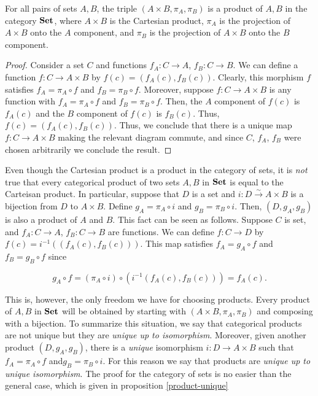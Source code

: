 \begin{prop}\label{product-in-set} For all pairs of sets $A,B$, the triple $(A\times B,\pi_A,\pi_B)$ is a product of $A,B$ in the category ${\bf Set}$, where $A\times B$ is the Cartesian product, $\pi_A$ is the projection of $A\times B$ onto the $A$ component, and $\pi_B$ is the projection of $A\times B$ onto the $B$ component.
\end{prop}
\begin{proof} Consider a set $C$ and functions $f_A:C\to A$, $f_B:C\to B$. We can define a function $f:C\to A\times B$ by $f(c)=(f_A(c),f_B(c))$. Clearly, this morphism $f$ satisfies $f_A=\pi_A\circ f$ and $f_B=\pi_B\circ f$. Moreover, suppose $f:C\to A\times B$ is any function with $f_A=\pi_A\circ f$ and $f_B=\pi_B\circ f$. Then, the $A$ component of $f(c)$ is $f_A(c)$ and the $B$ component of $f(c)$ is $f_B(c)$. Thus, $f(c)=(f_A(c),f_B(c))$. Thus, we conclude that there is a unique map $f:C\to A\times B$ making the relevant diagram commute, and since $C$, $f_A$, $f_B$ were chosen arbitrarily we conclude the result.
\end{proof}

\begin{rem} Even though the Cartesian product is a product in the category of sets, it is {\em not} true that every categorical product of two sets $A,B$ in ${\bf Set}$ is equal to the Carteisan product. In particular, suppose that $D$ is a set and $i:D\xrightarrow{\sim}A\times B$ is a bijection from $D$ to $A\times B$. Define $g_A=\pi_A\circ i$ and $g_B=\pi_B\circ i$. Then, $(D,g_A,g_B)$ is also a product of $A$ and $B$. This fact can be seen as follows. Suppose $C$ is set, and $f_A:C\to A$, $f_B:C\to B$ are functions. We can define $f:C\to D$ by $f(c)=i^{-1}((f_A(c),f_B(c)))$. This map satisfies $f_A=g_A\circ f$ and $f_B=g_B\circ f$ since

$$g_A\circ f =(\pi_A\circ i)\circ (i^{-1}(f_A(c),f_B(c)))=f_A(c).$$

This is, however, the only freedom we have for choosing products. Every product of $A,B$ in ${\bf Set}$ will be obtained by starting with $(A\times B,\pi_A,\pi_B)$ and composing with a bijection. To summarize this situation, we say that categorical products are not unique but they are {\em unique up to isomorphism}. Moreover, given another product $(D,g_A,g_B)$, there is a {\em unique} isomorphism $i:D\to A\times B$ such that $f_A=\pi_A\circ f$ and$g_B=\pi_B\circ i$. For this reason we say that products are {\em unique up to unique isomorphism}. The proof for the category of sets is no easier than the general case, which is given in proposition \ref{product-unique}
\end{rem}

